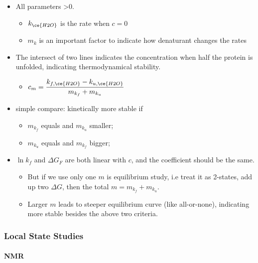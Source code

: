 \documentclass[]{article}
\let\oldparagraph\paragraph
\renewcommand{\paragraph}[1]{\oldparagraph{#1}\mbox{}}
\begin{document}
\begin{itemize}
\item
  All parameters \textgreater{}0.

  \begin{itemize}
  \item
    \(k_{\ce{H2O}}\) is the rate when \(c=0\)
  \item
    \(m_k\) is an important factor to indicate how denaturant changes
    the rates
  \end{itemize}
\item
  The intersect of two lines indicates the concentration when half the
  protein is unfolded, indicating thermodynamical stability.

  \begin{itemize}
  \item
    \(c_m=\dfrac{k_{f,\ce{H2O}}-k_{u,\ce{H2O}}}{m_{k_f}+m_{k_u}}\)
  \end{itemize}
\item
  simple compare: kinetically more stable if

  \begin{itemize}
  \item
    \(m_{k_f}\) equals and \(m_{k_u}\) smaller;
  \item
    \(m_{k_u}\) equals and \(m_{k_f}\) bigger;
  \end{itemize}
\item
  \(\ln k_f\) and \(\Delta G_F\) are both linear with \(c\), and the
  coefficient should be the same.

  \begin{itemize}
  \item
    But if we use only one \(m\) is equilibrium study, i.e treat it as
    2-states, add up two \(\Delta G\), then the total
    \(m=m_{k_f}+m_{k_u}\). 
  \item
    Larger \(m\) leads to steeper equilibrium curve (like all-or-none),
    indicating more stable besides the above two criteria.
  \end{itemize}
\end{itemize}

\hypertarget{local-state-studies}{%
\subsubsection{Local State Studies}\label{local-state-studies}}

\hypertarget{nmr}{%
\paragraph{NMR}\label{nmr}}
\end{document}
